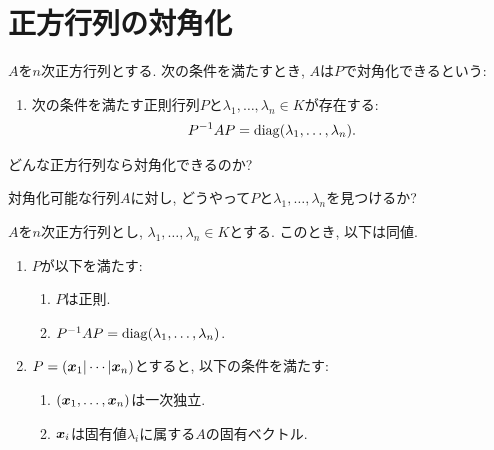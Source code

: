 \section{正方行列の対角化}
\begin{definition}
  $A$を$n$次正方行列とする.
  次の条件を満たすとき,
  $A$は$P$で対角化できるという:
  \begin{enumerate}
  \item 次の条件を満たす正則行列$P$と$\lambda_1,\ldots, \lambda_n\in K$が存在する:
    \begin{align*}
      P^{-1}AP=\operatorname{diag}(\lambda_1,\ldots,\lambda_n).
    \end{align*}
  \end{enumerate}
\end{definition}
\begin{problem}
    どんな正方行列なら対角化できるのか?
\end{problem}
\begin{problem}
  対角化可能な行列$A$に対し,
  どうやって$P$と$\lambda_1,\ldots,\lambda_n$を見つけるか?
\end{problem}
\begin{prop}
  $A$を$n$次正方行列とし,
    $\lambda_1,\ldots, \lambda_n\in K$とする.
    このとき, 以下は同値.
    \begin{enumerate}
    \item
      \label{diagonalizable:item:1}
      $P$が以下を満たす:
      \begin{enumerate}
      \item $P$は正則.
      \item $P^{-1}AP=\operatorname{diag}(\lambda_1,\ldots,\lambda_n)$.
      \end{enumerate}
    \item $P=(\boldsymbol{x}_1|\cdots|\boldsymbol{x}_n)$とすると, 以下の条件を満たす:
      \label{diagonalizable:item:2}
      \begin{enumerate}
      \item $(\boldsymbol{x}_1,\ldots,\boldsymbol{x}_n)$は一次独立.
      \item $\boldsymbol{x}_i$は固有値$\lambda_i$に属する$A$の固有ベクトル.
      \end{enumerate}
    \end{enumerate}
\end{prop}
